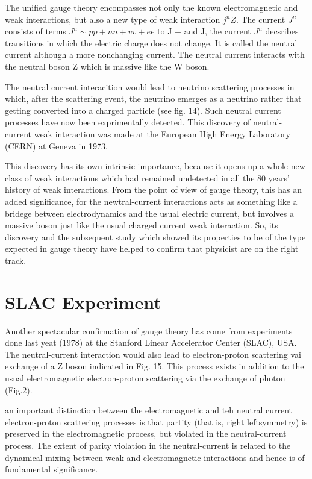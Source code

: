 The unified gauge theory encompasses not only the known electromagnetic and weak interactions, but also a new type of weak interaction $j^{n} Z$. The current $J^{n}$ consists of terms $J^{n} \sim \bar{p} p + n n + \bar{v} v + \bar{e}  e$ to J + and J, the current $J^{n}$ decsribes transitions in which the electric charge does not change. It is called the neutral current although a more nonchanging current. The neutral current interacts with the neutral boson Z which is massive like the W boson.

The neutral current interacition would lead to neutrino scattering processes in which, after the scattering event, the neutrino emerges as a neutrino rather that getting converted into a charged particle (see fig. 14). Such neutral current processes have now been exprimentally detected. This discovery of neutral-current weak interaction was made at the European High Energy Laboratory (CERN) at Geneva in 1973.

This discovery has its own intrinsic importance, because it opens up a whole new class of weak interactions which had remained undetected in all the 80 years' history of weak interactions. From the point of view of gauge theory, this has an added significance, for the newtral-current interactions acts as something like a bridege between electrodynamics and the usual electric current, but involves a massive boson just like the usual charged current weak interaction. So, its discovery and the subsequent study which showed its properties to be of the type expected in gauge theory have helped to confirm that physicist are on the right track.

\section*{SLAC Experiment}

Another spectacular confirmation of gauge theory has come from experiments done last yeat (1978) at the Stanford Linear Accelerator Center (SLAC), USA. The neutral-current interaction would also lead to electron-proton scattering vai exchange of a Z boson indicated in Fig. 15. This process exists in addition to the usual  electromagnetic electron-proton scattering via the exchange of photon (Fig.2).

an important distinction between the electromagnetic and teh neutral current electron-proton scattering processes is that partity (that is, right leftsymmetry) is preserved in the electromagnetic process, but violated in the neutral-current process. The extent of parity violation in the neutral-current is related to the dynamical mixing between weak and electromagnetic interactions and hence is of fundamental significance.

